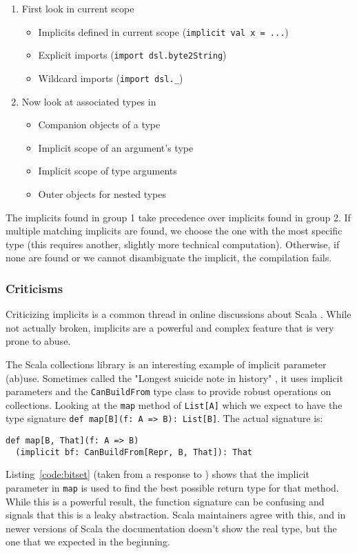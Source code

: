 \begin{enumerate}
	\item First look in current scope
	\begin{itemize}
		\item Implicits defined in current scope (\texttt{implicit val x = ...})
    \item Explicit imports (\texttt{import dsl.byte2String})
    \item Wildcard imports (\texttt{import dsl.\_})
	\end{itemize}
	\item Now look at associated types in
	\begin{itemize}
		\item Companion objects of a type
		\item Implicit scope of an argument’s type
		\item Implicit scope of type arguments
		\item Outer objects for nested types
	\end{itemize}
\end{enumerate}

The implicits found in group 1 take precedence over implicits found in group 2.
If multiple matching implicits are found, we choose the one with the most specific type (this requires another, slightly more technical computation).
Otherwise, if none are found or we cannot disambiguate the implicit, the compilation fails.

\subsubsection{Criticisms}

Criticizing implicits is a common thread in online discussions about Scala \autocite{Plush:2015, lakes:2009, Allan:2013, Hale:2011}.
While not actually broken, implicits are a powerful and complex feature that is very prone to abuse.

The Scala collections library is an interesting example of implicit parameter (ab)use.
Sometimes called the "Longest suicide note in history" \autocite{lakes:2009}, it uses implicit parameters and the \texttt{CanBuildFrom} type class to provide robust operations on collections.
Looking at the \texttt{map} method of \texttt{List[A]} which we expect to have the type signature \texttt{def map[B](f: A => B): List[B]}.
The actual signature is:
\begin{verbatim}
def map[B, That](f: A => B)
  (implicit bf: CanBuildFrom[Repr, B, That]): That
\end{verbatim}
Listing~\ref{code:bitset} (taken from a response to \autocite{lakes:2009}) shows that the implicit parameter in \texttt{map} is used to find the best possible return type for that method.
While this is a powerful result, the function signature can be confusing and signals that this is a leaky abstraction.
Scala maintainers agree with this, and in newer versions of Scala the documentation doesn't show the real type, but the one that we expected in the beginning.

